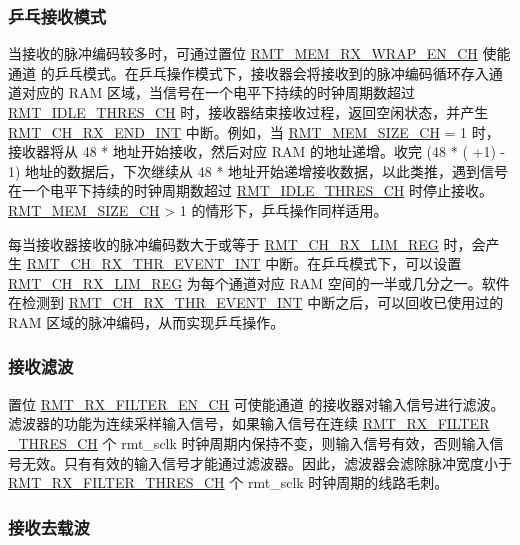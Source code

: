 \documentclass[main\_\_CN.tex]{subfiles}
\begin{document}
\subsubsection{乒乓接收模式}

当接收的脉冲编码较多时，可通过置位 \hyperref[fielddesc:RMTMEMRXWRAPENCHM]{RMT\_MEM\_RX\_WRAP\_EN\_CH} 使能通道  的乒乓模式。在乒乓操作模式下，接收器会将接收到的脉冲编码循环存入通道对应的 RAM 区域，当信号在一个电平下持续的时钟周期数超过 \hyperref[fielddesc:RMTIDLETHRESCHM]{RMT\_IDLE\_THRES\_CH} 时，接收器结束接收过程，返回空闲状态，并产生 \hyperref[int:RMTCHnRXENDINT]{RMT\_CH\_RX\_END\_INT} 中断。例如，当 \hyperref[fielddesc:RMTMEMSIZECHM]{RMT\_MEM\_SIZE\_CH} = 1 时，接收器将从 48 *  地址开始接收，然后对应 RAM 的地址递增。收完 (48 * ( +1) - 1) 地址的数据后，下次继续从 48 *  地址开始递增接收数据，以此类推，遇到信号在一个电平下持续的时钟周期数超过 \hyperref[fielddesc:RMTIDLETHRESCHM]{RMT\_IDLE\_THRES\_CH} 时停止接收。\hyperref[fielddesc:RMTMEMSIZECHM]{RMT\_MEM\_SIZE\_CH} > 1 的情形下，乒乓操作同样适用。

每当接收器接收的脉冲编码数大于或等于 \hyperref[fielddesc:RMTCHMRXLIMREG]{RMT\_CH\_RX\_LIM\_REG} 时，会产生
\hyperref[int:RMTCHmRXTHREVENTINT]{RMT\_CH\_RX\_THR\_EVENT\_INT} 中断。在乒乓模式下，可以设置 \hyperref[fielddesc:RMTCHMRXLIMREG]{RMT\_CH\_RX\_LIM\_REG}
为每个通道对应 RAM 空间的一半或几分之一。软件在检测到 \hyperref[int:RMTCHmRXTHREVENTINT]{RMT\_CH\_RX\_THR\_EVENT\_INT}
中断之后，可以回收已使用过的 RAM 区域的脉冲编码，从而实现乒乓操作。


\subsubsection{接收滤波}

置位 \hyperref[fielddesc:RMTRXFILTERENCHM]{RMT\_RX\_FILTER\_EN\_CH} 可使能通道  的接收器对输入信号进行滤波。滤波器的功能为连续采样输入信号，如果输入信号在连续 \hyperref[fielddesc:RMTRXFILTERTHRESCHM]{RMT\_RX\_FILTER \_THRES\_CH} 个 rmt\_sclk 时钟周期内保持不变，则输入信号有效，否则输入信号无效。只有有效的输入信号才能通过滤波器。因此，滤波器会滤除脉冲宽度小于 \hyperref[fielddesc:RMTRXFILTERTHRESCHM]{RMT\_RX\_FILTER\_THRES\_CH} 个 rmt\_sclk 时钟周期的线路毛刺。


\subsubsection{接收去载波}
\end{document}
